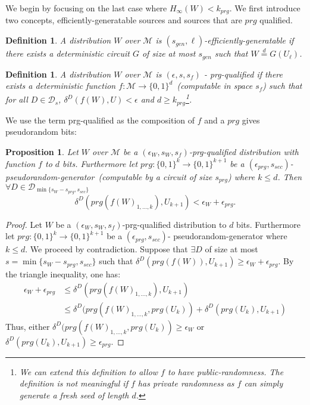 \documentclass[11pt]{article}
\newtheorem{proposition}[theorem]{Proposition}
\newtheorem{definition}[theorem]{Definition}
\begin{document}
{We begin by focusing on the last case where $H_\infty(W) < k_{prg}$.  We first introduce two concepts, efficiently-generatable sources and sources that are $prg$ qualified.

\begin{definition}
A distribution $W$ over $\mathcal{M}$ is \emph{$(s_{gen}, \ell)$-efficiently-generatable} if there exists a deterministic circuit $G$ of size at most $s_{gen}$ such that $W \overset{d}= G(U_{\ell})$.
\end{definition}
\begin{definition}
A distribution $W$ over $\mathcal{M}$ is \emph{$(\epsilon, s, s_{f})$ - prg-qualified} if there exists a deterministic function $f:\mathcal{M}\rightarrow \{0,1\}^d$~(computable in space $s_{f}$) such that for all $D\in\mathcal{D}_s$, $\delta^D(f(W), U)<\epsilon$ and $d\geq k_{prg}$\footnote{We can extend this definition to allow $f$ to have public-randomness.  The definition is not meaningful if $f$ has private randomness as $f$ can simply generate a fresh seed of length $d$.}.
\end{definition}
We use the term prg-qualified as the composition of $f$ and a $prg$ gives pseudorandom bits:
\begin{proposition}
Let $W$ over $\mathcal{M}$ be a $(\epsilon_{W}, s_W, s_{f})$-prg-qualified distribution with function $f$ to $d$ bits.  Furthermore let $prg:\{0,1\}^k\rightarrow \{0,1\}^{k+1}$ be a $(\epsilon_{prg}, s_{sec})$- pseudorandom-generator~(computable by a circuit of size $s_{prg}$) where $k\leq d$.  Then $\forall D\in\mathcal{D}_{\min\{s_W-s_{prg}, s_{sec}\}}$
\[
\delta^D(prg(f(W)_{1,..., k}), U_{k+1})< \epsilon_W + \epsilon_{prg}.
\]
\end{proposition}
\begin{proof}
Let $W$ be a $(\epsilon_{W}, s_W, s_{f})$-prg-qualified distribution to $d$ bits.  Furthermore let $prg:\{0,1\}^k\rightarrow \{0,1\}^{k+1}$ be a $(\epsilon_{prg}, s_{sec})$- pseudorandom-generator where $k\leq d$.  We proceed by contradiction.  Suppose that $\exists D$ of size at most $s= \min\{s_W -s_{prg}, s_{sec}\}$ such that $\delta^D(prg(f(W)), U_{k+1})\geq \epsilon_W+\epsilon_{prg}$.  By the triangle inequality, one has:
\begin{align*}
\epsilon_W+\epsilon_{prg}&\leq \delta^D(prg(f(W)_{1,...,k}), U_{k+1})\\
&\leq \delta^D(prg(f(W)_{1,...,k}, prg(U_k)) + \delta^D(prg(U_k), U_{k+1})
\end{align*}
Thus, either $\delta^D(prg(f(W)_{1,...,k}, prg(U_k))\geq \epsilon_{W}$ or $\delta^D(prg(U_k), U_{k+1})\geq \epsilon_{prg}$.


\end{proof}}
\end{document}
